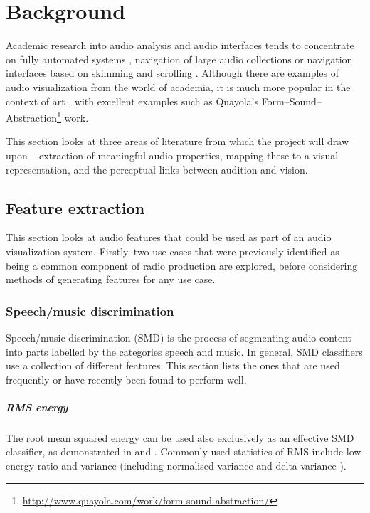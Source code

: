 \chapter{Background}\label{chpt:background}

Academic research into audio analysis and audio interfaces tends to concentrate
on fully automated systems \cite{AngueraMiro2012}, navigation of large audio
collections \cite{FontCorbera2010} or navigation interfaces based on skimming
\cite{Arons1997} and scrolling \cite{Lee2007}. Although there are examples of
audio visualization from the world of academia, it is much more popular in the
context of art \cite{Armitage2012}, with excellent examples such as Quayola's
Form--Sound--Abstraction\footnote{\url{http://www.quayola.com/work/form-sound-abstraction/}}
work.

This section looks at three areas of literature from which the project will
draw upon -- extraction of meaningful audio properties, mapping these to a
visual representation, and the perceptual links between audition and vision.

\section{Feature extraction}\label{sec:litreviewfeats}
This section looks at audio features that could be used as part of an audio
visualization system. Firstly, two use cases that were previously identified as
being a common component of radio production are explored, before considering
methods of generating features for any use case.

\subsection{Speech/music discrimination}
Speech/music discrimination (SMD) is the process of segmenting audio content
into parts labelled by the categories speech and music. In general, SMD
classifiers use a collection of different features. This section lists the ones
that are used frequently or have recently been found to perform well.

\paragraph{RMS energy}
The root mean squared energy can be used also exclusively as an effective SMD
classifier, as demonstrated in \cite{Ericsson2009} and \cite{Panagiotakis2005}.
Commonly used statistics of RMS include low energy ratio
\cite{Liang2005,Ericsson2009,Saunders1996,Scheirer1997} and variance
\cite{Ericsson2009} (including normalised variance \cite{Panagiotakis2005} and
delta variance \cite{Carey1999}).

